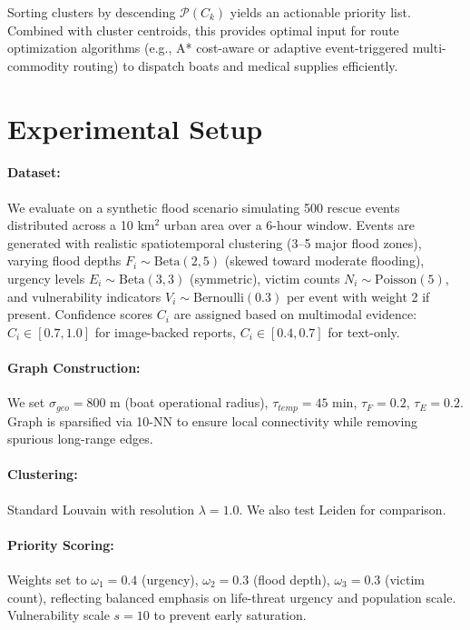 \documentclass[runningheads]{llncs}
\begin{document}
Sorting clusters by descending $\mathcal{P}(C_k)$ yields an actionable priority list. Combined with cluster centroids, this provides optimal input for route optimization algorithms (e.g., A* cost-aware or adaptive event-triggered multi-commodity routing) to dispatch boats and medical supplies efficiently.

\section{Experimental Setup}

\paragraph{Dataset:} We evaluate on a synthetic flood scenario simulating 500 rescue events distributed across a 10 km$^2$ urban area over a 6-hour window. Events are generated with realistic spatiotemporal clustering (3--5 major flood zones), varying flood depths $F_i \sim \text{Beta}(2,5)$ (skewed toward moderate flooding), urgency levels $E_i \sim \text{Beta}(3,3)$ (symmetric), victim counts $N_i \sim \text{Poisson}(5)$, and vulnerability indicators $V_i \sim \text{Bernoulli}(0.3)$ per event with weight 2 if present. Confidence scores $C_i$ are assigned based on multimodal evidence: $C_i \in [0.7, 1.0]$ for image-backed reports, $C_i \in [0.4, 0.7]$ for text-only.

\paragraph{Graph Construction:} We set $\sigma_{geo} = 800$ m (boat operational radius), $\tau_{temp} = 45$ min, $\tau_F = 0.2$, $\tau_E = 0.2$. Graph is sparsified via 10-NN to ensure local connectivity while removing spurious long-range edges.

\paragraph{Clustering:} Standard Louvain with resolution $\lambda=1.0$. We also test Leiden for comparison.

\paragraph{Priority Scoring:} Weights set to $\omega_1 = 0.4$ (urgency), $\omega_2 = 0.3$ (flood depth), $\omega_3 = 0.3$ (victim count), reflecting balanced emphasis on life-threat urgency and population scale. Vulnerability scale $s=10$ to prevent early saturation.
\end{document}
